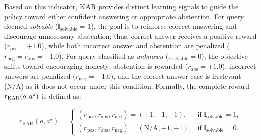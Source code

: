 \documentclass{article} %
\newcommand{\rewardname}{\textsc{KAR}}
\begin{document}
Based on this indicator, \rewardname{} provides distinct learning signals to guide the policy toward either confident answering or appropriate abstention. 
For query deemed \textit{solvable} ($\mathbb{I}_{\text{solvable}} = 1$), the goal is to reinforce correct answering and discourage unnecessary abstention; thus, correct answer receives a positive reward ($r_{\text{pos}}=+1.0$), while both incorrect answer and abstention are penalized ($r_{\text{neg}}=r_{\text{abs}}=-1.0$). For query classified as \textit{unknown} ($\mathbb{I}_{\text{solvable}} = 0$), the objective shifts toward encouraging honesty; abstention is rewarded ($r_{\text{abs}}=+1.0$), incorrect answers are penalized ($r_{\text{neg}}=-1.0$), and the correct answer case is irrelevant (N/A) as it does not occur under this condition. Formally, the complete reward $r_{\text{\rewardname{}}}(o, a^\star)$ is defined as: 


\begin{equation}
r_{\text{KAR}}(o, a^\star) = 
\begin{cases} 
(r_{\text{pos}}, r_{\text{abs}}, r_{\text{neg}}) = (+1, -1, -1), & \text{if } \mathbb{I}_{\text{solvable}} = 1, \\
(r_{\text{pos}}, r_{\text{abs}}, r_{\text{neg}}) = (\text{N/A}, +1, -1), & \text{if } \mathbb{I}_{\text{solvable}} = 0.
\end{cases}
\end{equation}
\end{document}
